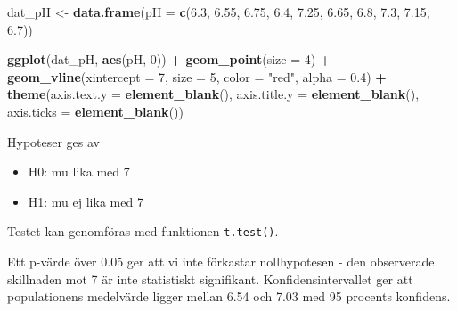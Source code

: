 \documentclass[
]{book}
\newenvironment{Shaded}{\begin{snugshade}}{\end{snugshade}}
\newcommand{\AttributeTok}[1]{\textcolor[rgb]{0.13,0.29,0.53}{#1}}
\newcommand{\DecValTok}[1]{\textcolor[rgb]{0.00,0.00,0.81}{#1}}
\newcommand{\FloatTok}[1]{\textcolor[rgb]{0.00,0.00,0.81}{#1}}
\newcommand{\FunctionTok}[1]{\textcolor[rgb]{0.13,0.29,0.53}{\textbf{#1}}}
\newcommand{\NormalTok}[1]{#1}
\newcommand{\OtherTok}[1]{\textcolor[rgb]{0.56,0.35,0.01}{#1}}
\newcommand{\SpecialCharTok}[1]{\textcolor[rgb]{0.81,0.36,0.00}{\textbf{#1}}}
\newcommand{\StringTok}[1]{\textcolor[rgb]{0.31,0.60,0.02}{#1}}
\providecommand{\tightlist}{%
  \setlength{\itemsep}{0pt}\setlength{\parskip}{0pt}}
\theoremstyle{definition}
\theoremstyle{definition}
\theoremstyle{definition}
\theoremstyle{definition}
\theoremstyle{remark}
\begin{document}
\begin{Shaded}
\begin{Highlighting}[]
\NormalTok{dat\_pH }\OtherTok{\textless{}{-}} \FunctionTok{data.frame}\NormalTok{(}\AttributeTok{pH =} \FunctionTok{c}\NormalTok{(}\FloatTok{6.3}\NormalTok{, }\FloatTok{6.55}\NormalTok{, }\FloatTok{6.75}\NormalTok{, }\FloatTok{6.4}\NormalTok{, }
                            \FloatTok{7.25}\NormalTok{, }\FloatTok{6.65}\NormalTok{, }\FloatTok{6.8}\NormalTok{, }\FloatTok{7.3}\NormalTok{, }\FloatTok{7.15}\NormalTok{, }\FloatTok{6.7}\NormalTok{))}

\FunctionTok{ggplot}\NormalTok{(dat\_pH, }\FunctionTok{aes}\NormalTok{(pH, }\DecValTok{0}\NormalTok{)) }\SpecialCharTok{+}
  \FunctionTok{geom\_point}\NormalTok{(}\AttributeTok{size =} \DecValTok{4}\NormalTok{) }\SpecialCharTok{+}
  \FunctionTok{geom\_vline}\NormalTok{(}\AttributeTok{xintercept =} \DecValTok{7}\NormalTok{, }\AttributeTok{size =} \DecValTok{5}\NormalTok{, }
             \AttributeTok{color =} \StringTok{"red"}\NormalTok{, }\AttributeTok{alpha =} \FloatTok{0.4}\NormalTok{) }\SpecialCharTok{+}
  \FunctionTok{theme}\NormalTok{(}\AttributeTok{axis.text.y =} \FunctionTok{element\_blank}\NormalTok{(), }
        \AttributeTok{axis.title.y =} \FunctionTok{element\_blank}\NormalTok{(), }
        \AttributeTok{axis.ticks =} \FunctionTok{element\_blank}\NormalTok{())}
\end{Highlighting}
\end{Shaded}

Hypoteser ges av

\begin{itemize}
\tightlist
\item
  H0: mu lika med 7
\item
  H1: mu ej lika med 7
\end{itemize}

Testet kan genomföras med funktionen \texttt{t.test()}.

\begin{Shaded}
\end{Shaded}

Ett p-värde över 0.05 ger att vi inte förkastar nollhypotesen - den observerade skillnaden mot 7 är inte statistiskt signifikant. Konfidensintervallet ger att populationens medelvärde ligger mellan 6.54 och 7.03 med 95 procents konfidens.
\end{document}
